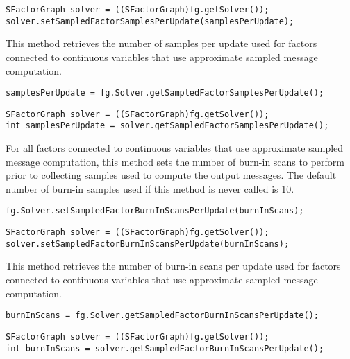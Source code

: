 \ifjava
\begin{lstlisting}
SFactorGraph solver = ((SFactorGraph)fg.getSolver());
solver.setSampledFactorSamplesPerUpdate(samplesPerUpdate);
\end{lstlisting}
\fi



This method retrieves the number of samples per update used for factors connected to continuous variables that use approximate sampled message computation.

\ifmatlab
\begin{lstlisting}
samplesPerUpdate = fg.Solver.getSampledFactorSamplesPerUpdate();
\end{lstlisting}
\fi

\ifjava
\begin{lstlisting}
SFactorGraph solver = ((SFactorGraph)fg.getSolver());
int samplesPerUpdate = solver.getSampledFactorSamplesPerUpdate();
\end{lstlisting}
\fi



For all factors connected to continuous variables that use approximate sampled message computation, this method sets the number of burn-in scans to perform prior to collecting samples used to compute the output messages.  The default number of burn-in samples used if this method is never called is 10.

\ifmatlab
\begin{lstlisting}
fg.Solver.setSampledFactorBurnInScansPerUpdate(burnInScans);
\end{lstlisting}
\fi

\ifjava
\begin{lstlisting}
SFactorGraph solver = ((SFactorGraph)fg.getSolver());
solver.setSampledFactorBurnInScansPerUpdate(burnInScans);
\end{lstlisting}
\fi



This method retrieves the number of burn-in scans per update used for factors connected to continuous variables that use approximate sampled message computation.

\ifmatlab
\begin{lstlisting}
burnInScans = fg.Solver.getSampledFactorBurnInScansPerUpdate();
\end{lstlisting}
\fi

\ifjava
\begin{lstlisting}
SFactorGraph solver = ((SFactorGraph)fg.getSolver());
int burnInScans = solver.getSampledFactorBurnInScansPerUpdate();
\end{lstlisting}
\fi


